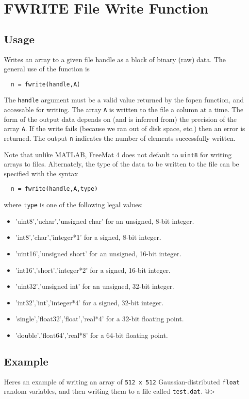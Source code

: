 \section{FWRITE File Write Function}

\subsection{Usage}

Writes an array to a given file handle as a block of binary (raw) data.
The general use of the function is
\begin{verbatim}
  n = fwrite(handle,A)
\end{verbatim}
The \verb|handle| argument must be a valid value returned by the fopen 
function, and accessable for writing. The array \verb|A| is written to
the file a column at a time.  The form of the output data depends
on (and is inferred from) the precision of the array \verb|A|.  If the 
write fails (because we ran out of disk space, etc.) then an error
is returned.  The output \verb|n| indicates the number of elements
successfully written.

Note that unlike MATLAB, FreeMat 4 does not default to \verb|uint8| for
writing arrays to files.  Alternately, the type of the data to be
written to the file can be specified with the syntax
\begin{verbatim}
  n = fwrite(handle,A,type)
\end{verbatim}
where \verb|type| is one of the following legal values:
\begin{itemize}
\item  'uint8','uchar','unsigned char' for an unsigned, 8-bit integer.

\item  'int8','char','integer*1' for a signed, 8-bit integer.

\item  'uint16','unsigned short' for an unsigned, 16-bit  integer.

\item  'int16','short','integer*2' for a signed, 16-bit integer.

\item  'uint32','unsigned int' for an unsigned, 32-bit integer.

\item  'int32','int','integer*4' for a signed, 32-bit integer.

\item  'single','float32','float','real*4' for a 32-bit floating point.

\item  'double','float64','real*8' for a 64-bit floating point.

\end{itemize}

\subsection{Example}

Heres an example of writing an array of \verb|512 x 512| Gaussian-distributed \verb|float| random variables, and then writing them to a file called \verb|test.dat|.
@>
